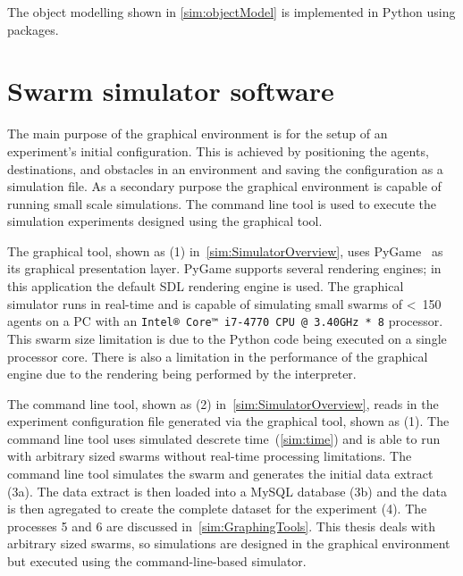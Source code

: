 The object modelling shown in \autoref{sim:objectModel} is implemented in Python using packages.

\section{Swarm simulator software}\label{sim:Simulator2}
The main purpose of the graphical environment is for the setup of an experiment's initial configuration. This is achieved by positioning the agents, destinations, and obstacles in an environment and saving the configuration as a simulation file. As a secondary purpose the graphical environment is capable of running small scale simulations. The command line tool is used to execute the simulation experiments designed using the graphical tool. 

The graphical tool, shown as (1) in~\autoref{sim:SimulatorOverview}, uses PyGame~\cite{PYGAME:15} as its graphical presentation layer. PyGame supports several rendering engines; in this application the default SDL rendering engine is used. The graphical simulator runs in real-time and is capable of simulating small swarms of \textless~150 agents on a PC with an \texttt{Intel® Core™ i7-4770 CPU @ 3.40GHz * 8} processor. This swarm size limitation is due to the Python code being executed on a single processor core. There is also a limitation in the performance of the graphical engine due to the rendering being performed by the interpreter.
 
The command line tool, shown as (2) in~\autoref{sim:SimulatorOverview}, reads in the experiment configuration file generated via the graphical tool, shown as (1). The command line tool uses simulated descrete time~(\autoref{sim:time}) and is able to run with  arbitrary sized swarms without real-time processing limitations. The command line tool simulates the swarm and generates the initial data extract (3a). The data extract is then loaded into a MySQL database (3b) and the data is then agregated to create the complete dataset for the experiment (4). The processes 5 and 6 are discussed in~\autoref{sim:GraphingTools}.  This thesis deals with arbitrary sized swarms, so simulations are designed in the graphical environment but executed using the command-line-based simulator. 

